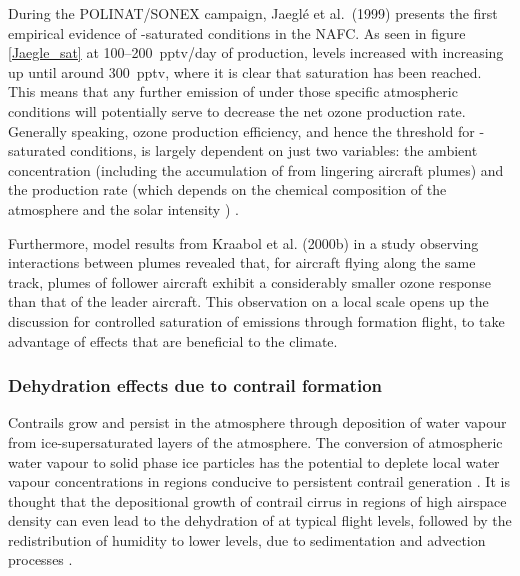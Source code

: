 During the POLINAT/SONEX campaign, Jaegl\'{e} et al.\ (1999) \cite{Jaegle1999} presents the first empirical evidence of -saturated conditions in the NAFC. As seen in figure \ref{Jaegle_sat} at 100--200~pptv/day of  production,  levels increased with increasing  up until around 300~pptv, where it is clear that  saturation has been reached. This means that any further emission of  under those specific atmospheric conditions will potentially serve to decrease the net ozone production rate. Generally speaking, ozone production efficiency, and hence the threshold for -saturated conditions, is largely dependent on just two variables: the ambient  concentration (including the accumulation of  from lingering aircraft plumes) and the  production rate (which depends on the chemical composition of the atmosphere and the solar intensity \cite{Monks2005}) \cite{Jaegle2001}. 

Furthermore, model results from Kraabol et al. (2000b) \cite{Kraabol2000b} in a study observing interactions between plumes revealed that, for aircraft flying along the same track, plumes of follower aircraft exhibit a considerably smaller ozone response than that of the leader aircraft. This observation on a local scale opens up the discussion for controlled saturation of emissions through formation flight, to take advantage of effects that are beneficial to the climate.

\subsubsection{Dehydration effects due to contrail formation}
Contrails grow and persist in the atmosphere through deposition of water vapour from ice-supersaturated layers of the atmosphere. The conversion of atmospheric water vapour to solid phase ice particles has the potential to deplete local water vapour concentrations in regions conducive to persistent contrail generation \cite{Unterstrasser2010}. It is thought that the depositional growth of contrail cirrus in regions of high airspace density can even lead to the dehydration of  at typical flight levels, followed by the redistribution of humidity to lower levels, due to sedimentation and advection processes \cite{Schumann2015}. 

